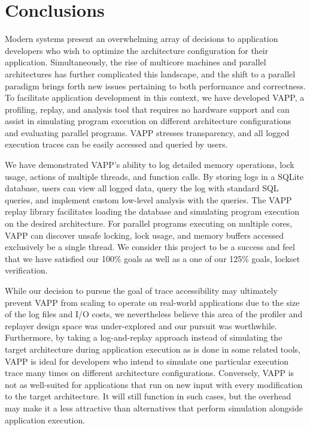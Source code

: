 \section{Conclusions}
Modern systems present an overwhelming array of decisions to
application developers who wish to optimize the architecture 
configuration for their application.  Simultaneously, the
rise of multicore machines and parallel architectures has
further complicated this landscape, and the shift to a parallel
paradigm brings forth new issues pertaining to both performance
and correctness.  To facilitate application development in this
context, we have developed VAPP, a profiling, replay, and analysis tool that 
requires no hardware support and can assist in simulating
program execution on different architecture configurations and
evaluating parallel programs.  VAPP stresses transparency, and
all logged execution traces can be easily accessed and queried
by users.

We have demonstrated VAPP's ability to log detailed memory operations,
lock usage, actions of multiple threads, and function calls.  By
storing logs in a SQLite database, users can view all logged data,
query the log with standard SQL queries, and implement custom
low-level analysis with the queries.  The VAPP replay library
facilitates loading the database and simulating program execution
on the desired architecture.  For parallel programs executing on multiple
cores, VAPP can discover unsafe locking, lock usage, and memory
buffers accessed exclusively be a single thread.  We consider this
project to be a success and feel that we have satisfied our 100\%
goals as well as a one of our 125\% goals, lockset verification.

While our decision to pursue the goal of trace accessibility may
ultimately prevent VAPP from scaling to operate on real-world
applications due to the size of the log files and I/O costs, we nevertheless
believe this area of the profiler and replayer
design space was under-explored and our pursuit was worthwhile.
Furthermore, by taking a log-and-replay approach instead of
simulating the target architecture during application execution
as is done in some related tools, VAPP is ideal for developers
who intend to simulate one particular execution trace many
times on different architecture configurations.  Conversely,
VAPP is not as well-suited for applications that run on new
input with every modification to the target architecture.  It will
still function in such cases, but the overhead may make it a less
attractive than alternatives that perform simulation alongside
application execution.

